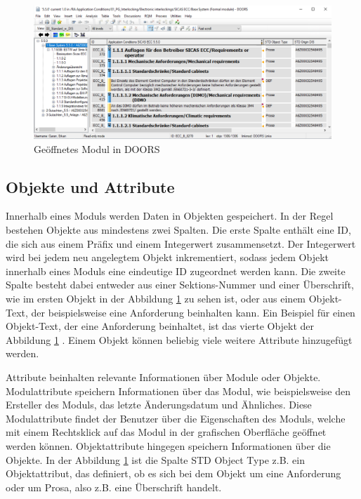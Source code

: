 \begin{figure}[h]
    \centering
    \includegraphics[width = \textwidth]{abbildungen/Modul in Doors.PNG}
    \caption{Geöffnetes Modul in \acs{DOORS}}
    \label{fig:Modul Doors}
\end{figure}

\subsection{Objekte und Attribute}
Innerhalb eines Moduls werden Daten in Objekten gespeichert. In der Regel bestehen Objekte aus mindestens zwei Spalten. Die erste 
Spalte enthält eine ID, die sich aus einem Präfix und einem Integerwert zusammensetzt. Der Integerwert wird bei jedem neu angelegtem 
Objekt inkrementiert, sodass jedem Objekt innerhalb eines Moduls eine eindeutige ID zugeordnet werden kann.
Die zweite Spalte besteht dabei entweder aus einer Sektions-Nummer und einer Überschrift, wie im ersten Objekt in der Abbildung 
\ref*{fig:Modul Doors} zu sehen ist, oder aus einem Objekt-Text, der beispielsweise eine Anforderung beinhalten kann. Ein Beispiel für 
einen Objekt-Text, der eine Anforderung beinhaltet, ist das vierte Objekt der Abbildung \ref*{fig:Modul Doors} \cite[vgl. S.178]{DOORS}.
Einem Objekt können beliebig viele weitere Attribute hinzugefügt werden. 

Attribute beinhalten relevante Informationen über Module oder Objekte. Modulattribute speichern Informationen über das Modul, wie beispielsweise
den Ersteller des Moduls, das letzte Änderungsdatum und Ähnliches. Diese Modulattribute findet der Benutzer über die Eigenschaften des Moduls, 
welche mit einem Rechtsklick auf das Modul in der grafischen Oberfläche geöffnet werden können. Objektattribute hingegen
speichern Informationen über die Objekte. In der Abbildung \ref*{fig:Modul Doors} ist die Spalte STD Object Type z.B. ein Objektattribut,
das definiert, ob es sich bei dem Objekt um eine Anforderung oder um Prosa, also z.B. eine Überschrift handelt.

